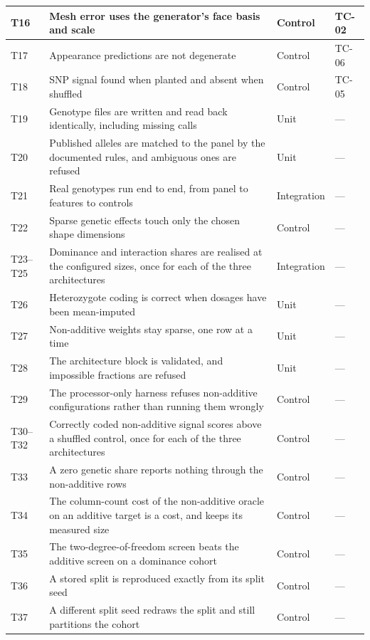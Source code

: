 {\begin{longtable}{|P{0.9cm}|P{9.3cm}|P{1.9cm}|P{1.9cm}|}
T16 & Mesh error uses the generator's face basis and scale & Control & TC-02 \\ \hline
T17 & Appearance predictions are not degenerate & Control & TC-06 \\ \hline
T18 & SNP signal found when planted and absent when shuffled & Control & TC-05 \\ \hline
T19 & Genotype files are written and read back identically, including missing calls & Unit & --- \\ \hline
T20 & Published alleles are matched to the panel by the documented rules, and ambiguous ones are refused & Unit & --- \\ \hline
T21 & Real genotypes run end to end, from panel to features to controls & Integration & --- \\ \hline
T22 & Sparse genetic effects touch only the chosen shape dimensions & Control & --- \\ \hline
T23--T25 & Dominance and interaction shares are realised at the configured sizes, once for each of the three architectures & Integration & --- \\ \hline
T26 & Heterozygote coding is correct when dosages have been mean-imputed & Unit & --- \\ \hline
T27 & Non-additive weights stay sparse, one row at a time & Unit & --- \\ \hline
T28 & The architecture block is validated, and impossible fractions are refused & Unit & --- \\ \hline
T29 & The processor-only harness refuses non-additive configurations rather than running them wrongly & Control & --- \\ \hline
T30--T32 & Correctly coded non-additive signal scores above a shuffled control, once for each of the three architectures & Control & --- \\ \hline
T33 & A zero genetic share reports nothing through the non-additive rows & Control & --- \\ \hline
T34 & The column-count cost of the non-additive oracle on an additive target is a cost, and keeps its measured size & Control & --- \\ \hline
T35 & The two-degree-of-freedom screen beats the additive screen on a dominance cohort & Control & --- \\ \hline
T36 & A stored split is reproduced exactly from its split seed & Control & --- \\ \hline
T37 & A different split seed redraws the split and still partitions the cohort & Control & --- \\ \hline

\end{longtable}}
